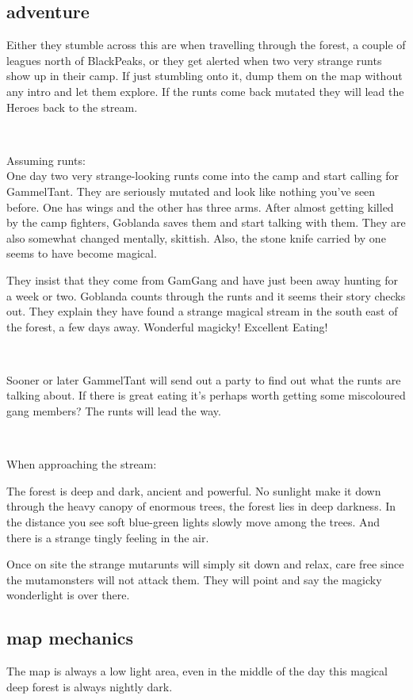 \subsection*{adventure}
Either they stumble across this are when travelling through the forest, a couple of leagues north of BlackPeaks, or they get alerted when two very strange runts show up in their camp. If just stumbling onto it, dump them on the map without any intro and let them explore. If the runts come back mutated they will lead the Heroes back to the stream.

\

Assuming runts:\\
One day two very strange-looking runts come into the camp and start calling for GammelTant. They are seriously mutated and look like nothing you've seen before. One has wings and the other has three arms. After almost getting killed by the camp fighters, Goblanda saves them and start talking with them. They are also somewhat changed mentally, skittish. Also, the stone knife carried by one seems to have become magical.

They insist that they come from GamGang and have just been away hunting for a week or two. Goblanda counts through the runts and it seems their story checks out. They explain they have found a strange magical stream in the south east of the forest, a few days away. Wonderful magicky! Excellent Eating!

\

Sooner or later GammelTant will send out a party to find out what the runts are talking about. If there is great eating it's perhaps worth getting some miscoloured gang members? The runts will lead the way.

\

\noindent When approaching the stream:
\begin{readoutloud}
The forest is deep and dark, ancient and powerful. No sunlight make it down through the heavy canopy of enormous trees, the forest lies in deep darkness. In the distance you see soft blue-green lights slowly move among the trees. And there is a strange tingly feeling in the air.
\end{readoutloud}

\noindent Once on site the strange mutarunts will simply sit down and relax, care free since the mutamonsters will not attack them. They will point and say the magicky wonderlight is over there.


\subsection*{map mechanics}
The map is always a low light area, even in the middle of the day this magical deep forest is always nightly dark.

